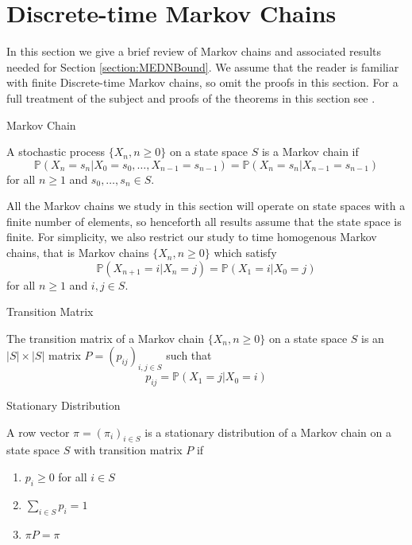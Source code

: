 \section{Discrete-time Markov Chains}

In this section we give a brief review of Markov chains and associated results needed for Section \ref{section:MEDNBound}. We assume that the reader is familiar with finite Discrete-time Markov chains, so omit the proofs in this section. For a full treatment of the subject and proofs of the theorems in this section see \cite{grimmetBook}.

\begin{definition}
	Markov Chain

	\noindent A stochastic process $\{X_n, n \geq 0 \}$ on a state space $S$ is a Markov chain if 
	$$
		\mathbb{P}(X_n = s_n | X_0 = s_0, \dots,  X_{n-1} = s_{n-1}) 
		= \mathbb{P}(X_n = s_n | X_{n-1} = s_{n-1})
	$$
	for all $n \geq 1$ and $s_0, \dots, s_n \in S$.
\end{definition}

All the Markov chains we study in this section will operate on state spaces with a finite number of elements, so henceforth all results assume that the state space is finite. For simplicity, we also restrict our study to time homogenous Markov chains, that is Markov chains $\{X_n, n \geq 0 \}$ which satisfy
$$
	\mathbb{P}(X_{n+1} = i | X_n = j)
	= \mathbb{P}(X_1 = i | X_0 = j)
$$
for all $n \geq 1$ and $i, j \in S$.

\begin{definition}
	Transition Matrix

	The transition matrix of a Markov chain $\{X_n, n \geq 0 \}$ on a state space $S$ is an $|S| \times |S|$ matrix $P=(p_{ij})_{i, j \in S}$ such that
	$$
		p_{ij} = \mathbb{P}(X_1 = j | X_0 = i)
	$$
\end{definition}

\begin{definition}
	Stationary Distribution

	\noindent
	A row vector $\pi=(\pi_i)_{i \in S}$ is a stationary distribution of a Markov chain on a state space $S$ with transition matrix $P$ if
	\begin{enumerate}
		\item $p_i \geq 0$ for all $i \in S$
		\item $\sum_{i \in S} p_i = 1$
		\item $\pi P = \pi$
	\end{enumerate}
\end{definition}

